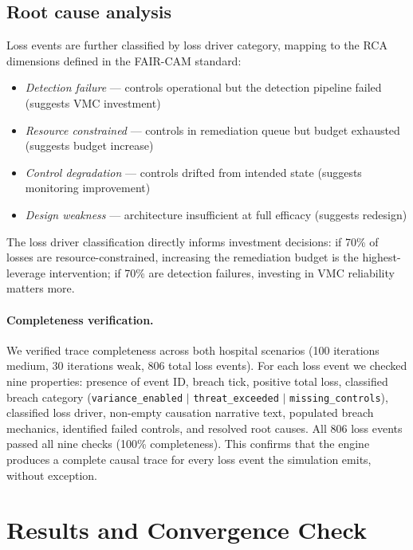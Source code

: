 \documentclass[11pt,a4paper]{article}
\begin{document}
\subsection{Root cause analysis}
\label{sec:rca}

Loss events are further classified by loss driver category, mapping to the RCA dimensions defined in the FAIR-CAM standard:
\begin{itemize}[nosep]
    \item \emph{Detection failure} --- controls operational but the detection pipeline failed (suggests VMC investment)
    \item \emph{Resource constrained} --- controls in remediation queue but budget exhausted (suggests budget increase)
    \item \emph{Control degradation} --- controls drifted from intended state (suggests monitoring improvement)
    \item \emph{Design weakness} --- architecture insufficient at full efficacy (suggests redesign)
\end{itemize}

The loss driver classification directly informs investment decisions: if 70\% of losses are resource-constrained, increasing the remediation budget is the highest-leverage intervention; if 70\% are detection failures, investing in VMC reliability matters more.

\paragraph{Completeness verification.} We verified trace completeness across both hospital scenarios (100 iterations medium, 30 iterations weak, 806 total loss events). For each loss event we checked nine properties: presence of event ID, breach tick, positive total loss, classified breach category (\texttt{variance\_\allowbreak enabled} $|$ \texttt{threat\_\allowbreak exceeded} $|$ \texttt{missing\_\allowbreak controls}), classified loss driver, non-empty causation narrative text, populated breach mechanics, identified failed controls, and resolved root causes. All 806 loss events passed all nine checks (100\% completeness). This confirms that the engine produces a complete causal trace for every loss event the simulation emits, without exception.


\section{Results and Convergence Check}
\label{sec:validation}
\end{document}
